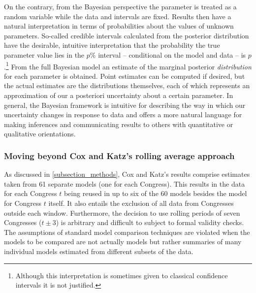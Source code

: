 On the contrary, from the Bayesian perspective the parameter is treated as a random 
variable while the data and intervals are fixed. Results then have a natural 
interpretation in terms of probabilities about the values of unknown parameters. 
So-called credible intervals calculated from the posterior distribution have the 
desirable, intuitive interpretation that the probability the true parameter value 
lies in the $p\%$ interval  -- conditional on the model and data -- is $p$.\footnote{
Although this interpretation is sometimes given to classical confidence intervals it is not justified.
} 
From the full Bayesian model an estimate of the marginal posterior {\it distribution} 
for each parameter is obtained. Point estimates can be computed if desired, but the actual 
estimates are the distributions themselves, each of which represents an approximation of 
our a posteriori uncertainty about a certain parameter. In general, the Bayesian framework 
is intuitive for describing the way in which our uncertainty changes in response to data and 
offers a more natural language for making inferences and communicating results to others
with quantitative or qualitative orientations.

 
\subsubsection{Moving beyond Cox and Katz's rolling average approach}

As discussed in \ref{subsection_methods}, Cox and Katz's results comprise estimates taken 
from 61 separate models (one for each Congress). This results in the data for each Congress 
$t$ being reused in up to six of the 60 models besides the model for Congress $t$ itself. It also 
entails the exclusion of all data from Congresses outside each window. Furthermore, the decision
to use rolling periods of seven Congresses ($t \pm 3$) is arbitrary and difficult to subject to formal
validity checks. The assumptions of standard model comparison techniques are violated when the 
models to be compared are not actually models but rather summaries of many individual 
models estimated from different subsets of the data. 


